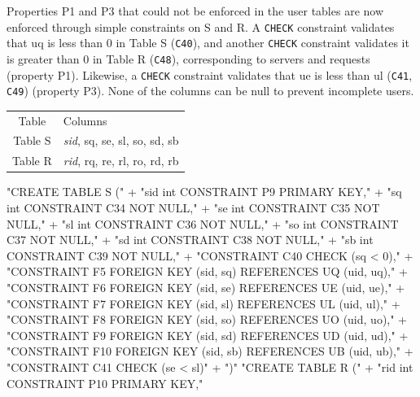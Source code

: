 Properties P1 and P3 that could not be enforced in the user tables are now
enforced through simple constraints on S and R.  A \texttt{CHECK} constraint
validates that \textsf{uq} is less than 0 in Table S ({\tt{}C40}), and another
\texttt{CHECK} constraint validates it is greater than 0 in Table R ({\tt{}C48}),
corresponding to servers and requests (property P1). Likewise, a \texttt{CHECK}
constraint validates that \textsf{ue} is less than \textsf{ul} ({\tt{}C41},
{\tt{}C49}) (property P3). None of the columns can be null to prevent incomplete
users.
\begin{table}[h]
\centering
\small
\begin{tabular}{|c|l|}
\hline
\rowcolor{TableTitle}
\multicolumn{2}{|c|}{User Constraint Tables}\\
\hline
\rowcolor{TableHeader}
Table & Columns \\
\hline
Table S & \textit{sid}, sq, se, sl, so, sd, sb \\
Table R & \textit{rid}, rq, re, rl, ro, rd, rb \\
\hline
\end{tabular}
\end{table}
\nwenddocs{}\endmoddef{}
"CREATE TABLE S ("
  + "sid int  CONSTRAINT P9 PRIMARY KEY,"
  + "sq  int  CONSTRAINT C34 NOT NULL,"
  + "se  int  CONSTRAINT C35 NOT NULL,"
  + "sl  int  CONSTRAINT C36 NOT NULL,"
  + "so  int  CONSTRAINT C37 NOT NULL,"
  + "sd  int  CONSTRAINT C38 NOT NULL,"
  + "sb  int  CONSTRAINT C39 NOT NULL,"
  + "CONSTRAINT C40 CHECK (sq < 0),"
  + "CONSTRAINT F5 FOREIGN KEY (sid, sq) REFERENCES UQ (uid, uq),"
  + "CONSTRAINT F6 FOREIGN KEY (sid, se) REFERENCES UE (uid, ue),"
  + "CONSTRAINT F7 FOREIGN KEY (sid, sl) REFERENCES UL (uid, ul),"
  + "CONSTRAINT F8 FOREIGN KEY (sid, so) REFERENCES UO (uid, uo),"
  + "CONSTRAINT F9 FOREIGN KEY (sid, sd) REFERENCES UD (uid, ud),"
  + "CONSTRAINT F10 FOREIGN KEY (sid, sb) REFERENCES UB (uid, ub),"
  + "CONSTRAINT C41 CHECK (se < sl)"
  + ")"
\nwendcode{}\nwdocspar
\nwenddocs{}\endmoddef{}
"CREATE TABLE R ("
  + "rid int  CONSTRAINT P10 PRIMARY KEY,"

